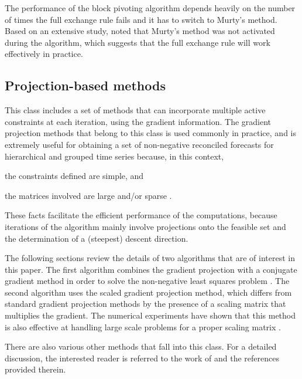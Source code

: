 \documentclass[11pt]{article}
\newcommand{\0}{\phantom{0}}
\begin{document}
The performance of the block pivoting algorithm depends heavily on the number of times the full exchange rule fails and it has to switch to Murty's method. Based on an extensive study, \citet{Kim2011} noted that Murty's method was not activated during the algorithm, which suggests that the full exchange rule will work effectively in practice. 


\subsection{Projection-based methods}
This class includes a set of methods that can incorporate multiple active constraints at each iteration, using the gradient information. The gradient projection methods that belong to this class is used commonly in practice, and is extremely useful for obtaining a set of non-negative reconciled forecasts for hierarchical and grouped time series because, in this context, \begin{inparaenum}[(i)] \item the constraints defined are simple, and \item the matrices involved are large and/or sparse \citep{Nocedal2006}. \end{inparaenum} These facts facilitate the efficient performance of the computations, because iterations of the algorithm mainly involve projections onto the feasible set and the determination of a (steepest) descent direction. 

The following sections review the details of two algorithms that are of interest in this paper. The first algorithm combines the gradient projection with a conjugate gradient method in order to solve the non-negative least squares problem \citep{Nocedal2006}. The second algorithm uses the scaled gradient projection method, which differs from standard gradient projection methods by the presence of a scaling matrix that multiplies the gradient. The numerical experiments have shown that this method is also effective at handling large scale problems for a proper scaling matrix \citep{Bonettini2009}. 

There are also various other methods that fall into this class. For a detailed discussion, the interested reader is referred to the work of \citet{Chen2009} and the references provided therein.
\end{document}
